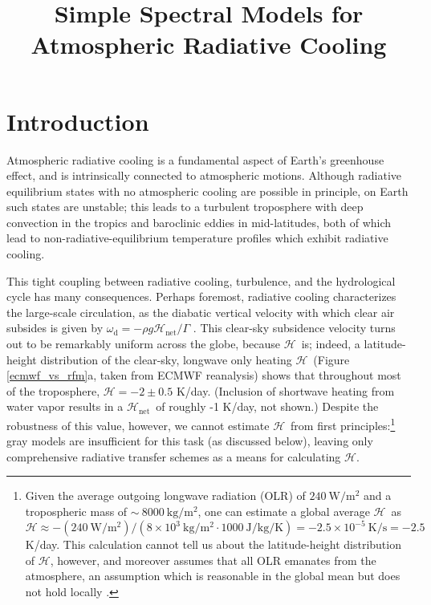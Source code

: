 \documentclass{ametsoc}
\title{Simple Spectral Models for Atmospheric Radiative Cooling}
\affiliation{Princeton University, Princeton, New Jersey}
\newcommand{\second}{\ensuremath{\mathrm{s}}}
\newcommand{\kg}{\ensuremath{\mathrm{kg}}}
\newcommand{\meter}{\ensuremath{\mathrm{m}}}
\newcommand{\Kelvin}{\ensuremath{\mathrm{K}}}
\newcommand{\Wmsq}{\ensuremath{\mathrm{W/m^2}}}
\newcommand{\joule}{\ensuremath{\mathrm{J}}}
\newcommand{\ch}{\ensuremath{\mathcal{H}}}
\newcommand{\chnet}{\ensuremath{\ch_\mathrm{net}}}
\newcommand{\omegadiab}{\ensuremath{\omega_{\mathrm{d}}}}
\begin{document}
\maketitle


%
\section {Introduction}
Atmospheric radiative cooling is a fundamental aspect of Earth's greenhouse effect, and is intrinsically connected to atmospheric motions. Although  radiative equilibrium  states with no atmospheric cooling are possible in principle, on Earth such states are unstable; this leads to a turbulent troposphere with deep convection in the tropics and baroclinic eddies in mid-latitudes, both of which lead to non-radiative-equilibrium temperature profiles which exhibit radiative cooling.

This tight coupling between radiative cooling, turbulence, and the hydrological cycle has many consequences. Perhaps foremost,  radiative cooling characterizes the large-scale circulation, as the diabatic vertical velocity with which clear air subsides is given by  $\omegadiab   =  -\rho g\chnet/\Gamma$ \citep[e.g.][here \chnet\ is clear-sky net radiative heating rate  in K/day, positive for heating, and all other symbols have their usual meaning]{mapes2001}. 
This clear-sky subsidence velocity turns out to be remarkably uniform across the globe, because \ch\ is; indeed, a latitude-height distribution of the clear-sky, longwave only heating  \ch\ (Figure \ref{ecmwf_vs_rfm}a, taken from ECMWF reanalysis) shows that throughout most of the troposphere, $\ch  =  -2 \pm 0.5 $ K/day. (Inclusion of shortwave heating from water vapor results in a \chnet\ of roughly  -1 K/day, not shown.) Despite the robustness of this value, however, we cannot estimate \ch\ from first principles:\footnote{Given the average outgoing longwave radiation (OLR) of $240\ \Wmsq$ and a tropospheric mass of $\sim\ 8000\ \kg/\meter^2$, one can estimate a global average \ch\  as $\ch \approx - (240\ \Wmsq)/(8\times 10^3\ \kg/\meter^2 \cdot 1000\ \joule/\kg/\Kelvin) = - 2.5 \times 10^{-5} \ \Kelvin/\second = -2.5$ K/day. This calculation cannot tell us about the latitude-height distribution of \ch, however, and moreover assumes that all OLR emanates from the atmosphere, an  assumption which is reasonable  in the global mean but does not hold locally \citep[][]{costa2012}.} 
gray models are insufficient for this task (as discussed below), leaving only comprehensive radiative transfer schemes as a means for calculating \ch.
\end{document}
